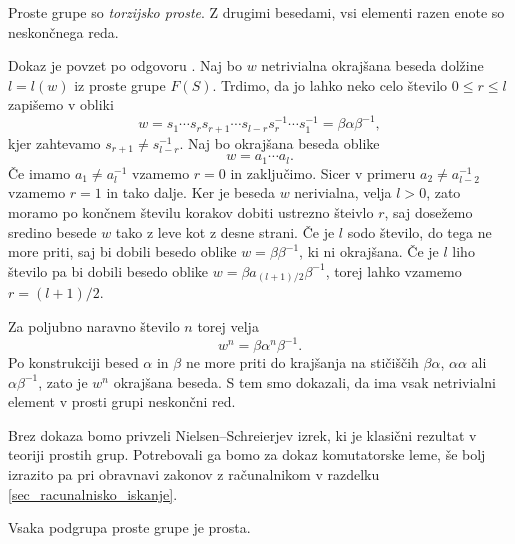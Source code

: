 \begin{trditev}\label{trd_prosta_grupa_je_torzijsko_prosta}
    Proste grupe so \emph{torzijsko proste}. Z drugimi besedami, vsi elementi razen enote so neskončnega reda. 
\end{trditev}
\begin{dokaz}
Dokaz je povzet po odgovoru \cite{math_stack_2207776_torsion_free}.
Naj bo $w$ netrivialna okrajšana beseda dolžine $l = l(w)$ iz proste grupe $F(S)$. Trdimo, da jo lahko neko celo število $0 \le r \le l$ zapišemo v obliki \begin{equation*}
w = s_1 \cdots  s_r s_{r + 1} \cdots s_{l -r} s_{r}^{-1} \cdots s_1^{-1} = \beta \alpha \beta^{-1}, 
\end{equation*}  
kjer zahtevamo $s_{r + 1} \neq s_{l - r}^{-1}$. Naj bo okrajšana beseda oblike \begin{equation*}
w = a_1 \cdots  a_l.
\end{equation*}  
Če imamo $a_1 \neq a_l^{-1}$ vzamemo $r = 0$ in zaključimo. Sicer v primeru $a_2 \neq a_{l - 2}^{-1}$ vzamemo $r = 1$ in tako dalje. Ker je beseda $w$ nerivialna, velja $l > 0$,
zato moramo po končnem številu korakov dobiti ustrezno šteivlo $r$, saj dosežemo sredino besede $w$ tako z leve kot z desne strani. Če je $l$ sodo število, do tega ne more priti, saj bi dobili besedo oblike
$w = \beta \beta^{-1}$, ki ni okrajšana. Če je $l$ liho število pa bi dobili besedo oblike $w = \beta a_{(l + 1) / 2}  \beta^{-1}$, torej lahko vzamemo $r = (l + 1) / 2$.

Za poljubno naravno število $n$ torej velja \begin{equation*}
w^{n} = \beta \alpha^{n} \beta^{-1}.
\end{equation*}  
  Po konstrukciji besed $\alpha$ in $\beta$ ne more priti do krajšanja na stičiščih $\beta \alpha$, $\alpha \alpha$ ali $\alpha \beta^{-1}$, zato je $w^{n}$ okrajšana beseda.
  S tem smo dokazali, da ima vsak netrivialni element v prosti grupi neskončni red.
\end{dokaz}


Brez dokaza bomo privzeli Nielsen--Schreierjev izrek, ki je klasični rezultat v teoriji prostih grup. Potrebovali ga bomo za dokaz komutatorske leme,
še bolj izrazito pa pri obravnavi zakonov z računalnikom v razdelku \ref{sec_racunalnisko_iskanje}. 

\begin{izrek}
\label{izr_nielsen_schreier}
 Vsaka podgrupa proste grupe je prosta.
\end{izrek}

